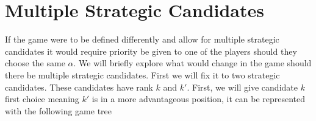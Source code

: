 \documentclass{article}
\begin{document}
\section{Multiple Strategic Candidates}

If the game were to be defined differently and allow for multiple strategic candidates it would require priority be given to one of the players should they choose the same $\alpha$. We will briefly explore what would change in the game should there be multiple strategic candidates. First we will fix it to two strategic candidates. These candidates have rank $k$ and $k'$. First, we will give candidate $k$ first choice meaning $k'$ is in a more advantageous position, it can be represented with the following game tree


\begin{figure}[H]
\centering
{}
\end{figure}
\end{document}
